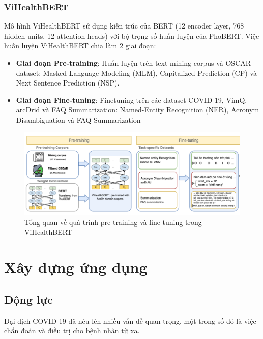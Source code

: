 \documentclass[12pt]{article}
\begin{document}
\subsubsection{ViHealthBERT}
Mô hình ViHealthBERT sử dụng kiến trúc của BERT (12 encoder layer, 768 hidden units, 12 attention heads) với bộ trọng số huấn luyện của PhoBERT. Việc huấn luyện ViHealthBERT chia làm 2 giai đoạn:
\begin{itemize}
\item \textbf{Giai đoạn Pre-training}: Huấn luyện trên text mining corpus và OSCAR dataset: Masked Language Modeling (MLM), Capitalized Prediction (CP) và Next Sentence Prediction (NSP).
\item \textbf{Giai đoạn Fine-tuning}: Finetuning trên các dataset COVID-19, VimQ, arcDrid và FAQ Summarization: Named-Entity Recognition (NER), Acronym Disambiguation và FAQ Summarization
\end{itemize}
\begin{figure}[H]
\begin{center}
\includegraphics[scale=.8]{img/ViHealthBert.png}
\caption{Tổng quan về quá trình pre-training và fine-tuning trong ViHealthBERT\cite{minh-EtAl:2022:LREC}}
\end{center}
\end{figure}

\section{Xây dựng ứng dụng}
\subsection{Động lực}
Đại dịch COVID-19 đã nêu lên nhiều vấn đề quan trọng, một trong số đó là việc chẩn đoán và điều trị cho bệnh nhân từ xa.
\end{document}

